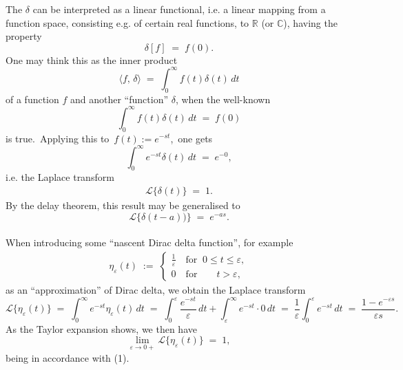 \documentclass[12pt]{article}
\theoremstyle{definition}
\begin{document}
The  $\delta$ can be interpreted as a linear functional, i.e. a linear mapping from a function space, consisting e.g. of certain real functions, to $\mathbb{R}$ (or $\mathbb{C}$), having the property
$$\delta[f] \;=\; f(0).$$
One may think this as the inner product
$$\langle f,\,\delta\rangle \;=\; \int_0^\infty\!f(t)\delta(t)\,dt$$
of a function $f$ and another ``function'' $\delta$, when the well-known 
$$\int_0^\infty\!f(t)\delta(t)\,dt \;=\; f(0)$$
is true.\, Applying this to\, $f(t) := e^{-st}$,\, one gets
$$\int_0^\infty\!e^{-st}\delta(t)\,dt \;=\; e^{-0},$$
i.e. the Laplace transform
\begin{align}
\mathcal{L}\{\delta(t)\} \;=\; 1.
\end{align}
By the delay theorem, this result may be generalised to
$$\mathcal{L}\{\delta(t\!-\!a))\} \;=\; e^{-as}.$$\\



When introducing some ``nascent Dirac delta function'', for example
\begin{align*}
\eta_\varepsilon(t) \;:=\; 
\begin{cases}
\frac{1}{\varepsilon} \quad \mbox{for}\;\; 0 \le t \le \varepsilon,\\
0 \quad \mbox{for} \qquad t > \varepsilon,
\end{cases}
\end{align*}
as an ``approximation'' of Dirac delta, we obtain the Laplace transform
$$\mathcal{L}\{\eta_\varepsilon(t)\} \;=\; \int_0^\infty\!e^{-st}\eta_\varepsilon(t)\,dt
\;=\; \int_0^\varepsilon\frac{e^{-st}}{\varepsilon}\,dt+\int_\varepsilon^\infty\!e^{-st}\cdot0\,dt 
\;=\; \frac{1}{\varepsilon}\int_0^\varepsilon\!e^{-st}\,dt \;=\; \frac{1\!-\!e^{-\varepsilon s}}{\varepsilon s}.$$
As the Taylor expansion shows, we then have
$$\lim_{\varepsilon\to0+}\mathcal{L}\{\eta_\varepsilon(t)\} \;=\; 1,$$
being in accordance with (1).

\end{document}
